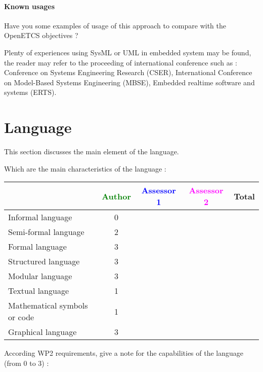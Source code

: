 \paragraph{Known usages} Have you some examples of usage of this
approach to  compare with the OpenETCS objectives ?

Plenty of experiences using SysML or UML in embedded system may be
found, the reader may refer to the proceeding of international
conference such as : Conference on Systems Engineering
Research (CSER), International Conference on Model-Based Systems Engineering
(MBSE), Embedded realtime software and systems (ERTS).
 

\section{Language}
This section discusses the main element of the language.

Which are the main characteristics of the language :

\begin{tabular}{|l | c | c | c | c|}
\hline
& \textcolor{green}{Author} & \textcolor{blue}{Assessor 1} & \textcolor{magenta}{Assessor 2} & Total \\
\hline 
Informal language & 0 & & &  \\
\hline 
Semi-formal language & 2 & & &  \\
\hline
Formal language & 3 & & &  \\
\hline
Structured language &3 & & & \\
\hline
Modular language &3 & & & \\
\hline
Textual language & 1 & & & \\
\hline
Mathematical symbols or code &1 &  & & \\
\hline
Graphical language &3 & & & \\
\hline
\end{tabular}

According WP2 requirements, give a note for the capabilities of the language (from 0 to 3) :


